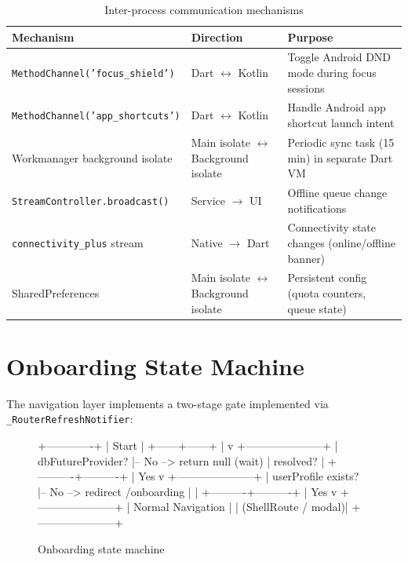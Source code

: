 \documentclass[12pt,a4paper,openany]{report}
\begin{document}
\begin{table}[H]
\centering
\caption{Inter-process communication mechanisms}
\label{tab:ipc}
\begin{tabular}{llp{7cm}}
\toprule
\textbf{Mechanism} & \textbf{Direction} & \textbf{Purpose} \\
\midrule
\texttt{MethodChannel('focus\_shield')} & Dart $\leftrightarrow$ Kotlin & Toggle Android DND mode during focus sessions \\
\texttt{MethodChannel('app\_shortcuts')} & Dart $\leftrightarrow$ Kotlin & Handle Android app shortcut launch intent \\
Workmanager background isolate & Main isolate $\leftrightarrow$ Background isolate & Periodic sync task (15 min) in separate Dart VM \\
\texttt{StreamController.broadcast()} & Service $\rightarrow$ UI & Offline queue change notifications \\
\texttt{connectivity\_plus} stream & Native $\rightarrow$ Dart & Connectivity state changes (online/offline banner) \\
SharedPreferences & Main isolate $\leftrightarrow$ Background isolate & Persistent config (quota counters, queue state) \\
\bottomrule
\end{tabular}
\end{table}

\section{Onboarding State Machine}

The navigation layer implements a two-stage gate implemented via \texttt{\_RouterRefreshNotifier}:

\begin{figure}[H]
\centering
\begin{blockverbatim}
+-------------+
|   Start     |
+------+------+
       |
       v
+---------------------+
| dbFutureProvider?   |-- No --> return null (wait)
|   resolved?         |
+----------+----------+
           | Yes
           v
+---------------------+
| userProfile exists? |-- No --> redirect /onboarding
|                     |
+----------+----------+
           | Yes
           v
+---------------------+
| Normal Navigation   |
| (ShellRoute / modal)|
+---------------------+
\end{blockverbatim}
\caption{Onboarding state machine}
\label{fig:onboarding-state-machine}
\end{figure}
\end{document}
